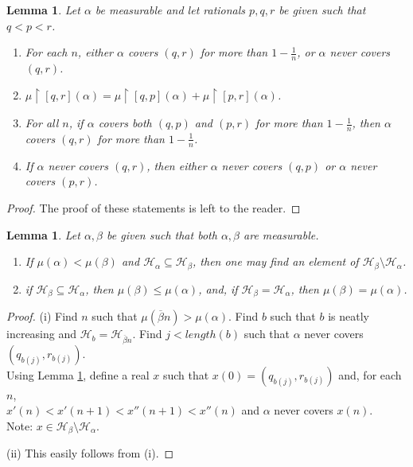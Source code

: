 \documentclass[a4paper]{amsart}
\theoremstyle{plain}
\newtheorem{lemma}[theorem]{Lemma}
\begin{document}
   \begin{lemma}\label{L:measurecover} Let $\alpha$ be measurable and let rationals $p,q,r$ be given such that $q<p<r$. \begin{enumerate}[\upshape (i)]\item  For each $n$, either $\alpha$ covers $(q,r)$ for more than $1-\frac{1}{n}$, or $\alpha$ never covers $(q,r)$. \item $\mu\upharpoonright[q,r](\alpha)=\mu\upharpoonright[q,p](\alpha)+\mu\upharpoonright[p,r](\alpha)$.
   
   \item For all $n$,
   if $\alpha$ covers both $(q,p)$ and $(p,r)$ for more than $1-\frac{1}{n}$, then $\alpha$ covers $(q,r)$ for more than $1-\frac{1}{n}$. \item
   If $\alpha$ never covers $(q,r)$, then {\it either} $\alpha$ never covers $(q,p)$ {\it or} $\alpha$ never covers $(p,r)$.\end{enumerate}\end{lemma}
 \begin{proof} The proof of these statements is left to the reader. \end{proof}  
   
 \begin{lemma}\label{L:measurable} Let $\alpha, \beta$ be given such that  both $\alpha, \beta$ are measurable. \begin{enumerate}[\upshape (i)]  \item If $\mu(\alpha)<\mu(\beta)$ and $\mathcal{H}_\alpha\subseteq \mathcal{H}_\beta$, then one may find an element of $\mathcal{H}_\beta\setminus \mathcal{H}_\alpha$. 
 \item if $\mathcal{H}_\beta\subseteq \mathcal{H}_\alpha$, then $\mu(\beta)\le\mu(\alpha)$, and,  if $\mathcal{H}_\beta= \mathcal{H}_\alpha$, then $\mu(\beta)=\mu(\alpha)$. \end{enumerate}\end{lemma}
 
 
  
 \begin{proof} (i) Find $n$ such that $\mu(\overline \beta n)>\mu(\alpha)$. Find $b$ such that $b$ is neatly increasing and $\mathcal{H}_b = \mathcal{H}_{\overline \beta n}$. Find $j<length(b)$ such that $\alpha$ never covers $ (q_{b(j)}, r_{b(j)})$. \\Using Lemma \ref{L:measurecover},  define a real $x$ such that $x(0)= (q_{b(j)}, r_{b(j)})$ and, for each $n$, \\$x'(n)<x'(n+1)<x''(n+1)<x''(n)$ and $\alpha$ never covers $x(n)$. \\Note: $x\in \mathcal{H}_\beta\setminus \mathcal{H}_\alpha$.
 
 \smallskip (ii) This easily follows from (i).
  \end{proof}
   
\end{document}
